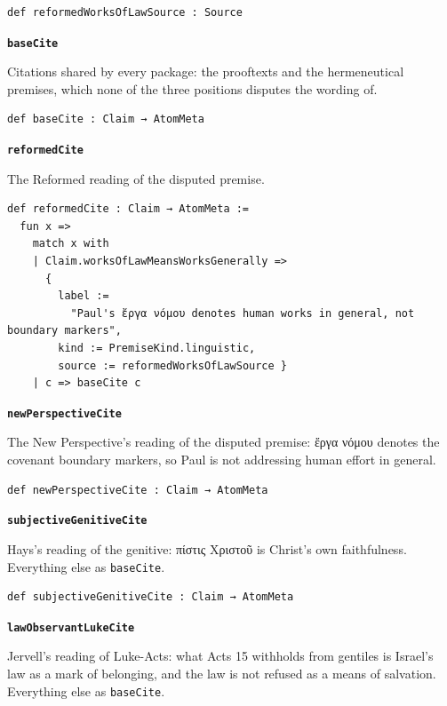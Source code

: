 \documentclass[11pt]{article}
\begin{document}
{\small\begin{verbatim}
def reformedWorksOfLawSource : Source
\end{verbatim}}
\par\medskip\noindent\textbf{\texttt{base\allowbreak{}Cite}}\par\nobreak\noindent
Citations shared by every package: the prooftexts and the hermeneutical premises, which none of the three positions disputes the wording of.

{\small\begin{verbatim}
def baseCite : Claim → AtomMeta
\end{verbatim}}
\par\medskip\noindent\textbf{\texttt{reformed\allowbreak{}Cite}}\par\nobreak\noindent
The Reformed reading of the disputed premise.

{\small\begin{verbatim}
def reformedCite : Claim → AtomMeta :=
  fun x =>
    match x with
    | Claim.worksOfLawMeansWorksGenerally =>
      {
        label :=
          "Paul's ἔργα νόμου denotes human works in general, not boundary markers",
        kind := PremiseKind.linguistic,
        source := reformedWorksOfLawSource }
    | c => baseCite c
\end{verbatim}}
\par\medskip\noindent\textbf{\texttt{new\allowbreak{}Perspective\allowbreak{}Cite}}\par\nobreak\noindent
The New Perspective's reading of the disputed premise: ἔργα νόμου denotes the covenant boundary markers, so Paul is not addressing human effort in general.

{\small\begin{verbatim}
def newPerspectiveCite : Claim → AtomMeta
\end{verbatim}}
\par\medskip\noindent\textbf{\texttt{subjective\allowbreak{}Genitive\allowbreak{}Cite}}\par\nobreak\noindent
Hays's reading of the genitive: πίστις Χριστοῦ is Christ's own faithfulness. Everything else as \texttt{base\allowbreak{}Cite}.

{\small\begin{verbatim}
def subjectiveGenitiveCite : Claim → AtomMeta
\end{verbatim}}
\par\medskip\noindent\textbf{\texttt{law\allowbreak{}Observant\allowbreak{}Luke\allowbreak{}Cite}}\par\nobreak\noindent
Jervell's reading of Luke-Acts: what Acts 15 withholds from gentiles is Israel's law as a mark of belonging, and the law is not refused as a means of salvation. Everything else as \texttt{base\allowbreak{}Cite}.
\end{document}
